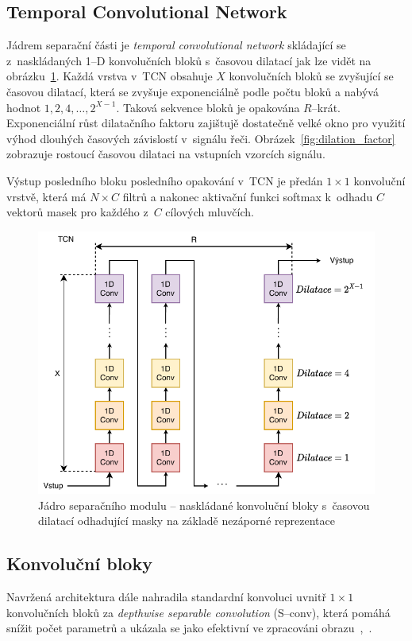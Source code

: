 \subsection{Temporal Convolutional Network}
Jádrem separační části je \textit{temporal convolutional network} skládající se z~naskládaných  1--D konvolučních bloků s~časovou dilatací jak lze vidět na obrázku~\ref{fig:tasnet-stacked-resblocks}. Každá vrstva v~TCN obsahuje $X$ konvolučních bloků se zvyšující se časovou dilatací, která se zvyšuje exponenciálně podle počtu bloků a nabývá hodnot $1, 2, 4, \dots, 2^{X-1}$. Taková sekvence bloků je opakována $R$--krát. Exponenciální růst dilatačního faktoru zajištujě dostatečně velké okno pro využití výhod dlouhých časových závislostí v~signálu řeči. Obrázek~\ref{fig:dilation_factor} zobrazuje rostoucí časovou dilataci na vstupních vzorcích signálu.

Výstup posledního bloku posledního opakování v~TCN je předán $1 \times 1$ konvoluční vrstvě, která má $N \times C$ filtrů a nakonec aktivační funkci softmax k~odhadu $C$ vektorů masek pro každého z~$C$ cílových mluvčích.


\begin{figure}[H]
    \centering
    \includegraphics[scale=0.9]{obrazky-figures/stacked_resblocks.pdf}
    \caption{\label{fig:tasnet-stacked-resblocks}Jádro separačního modulu -- naskládané konvoluční bloky s~časovou dilatací odhadující masky na základě nezáporné reprezentace}
\end{figure}



\subsection{Konvoluční bloky}
Navržená architektura dále nahradila standardní konvoluci uvnitř $1 \times 1$ konvolučních bloků za \textit{depthwise separable convolution} (S--conv), která pomáhá snížit počet parametrů a ukázala se jako efektivní ve zpracováni obrazu~\cite{Chollet_2017_CVPR},~\cite{MobileNets}.

